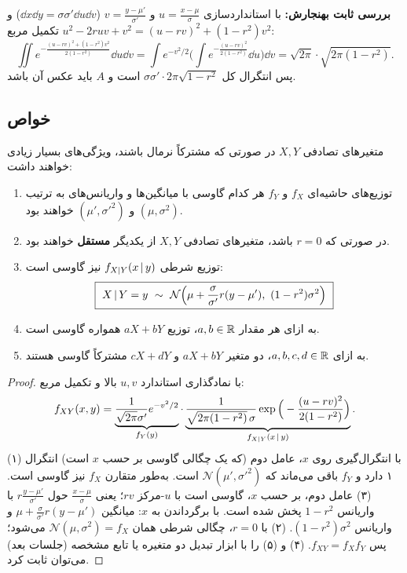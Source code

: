 \begin{note}
\notetitle \textbf{بررسی ثابت بهنجارش:} با استانداردسازی $u=\frac{x-\mu}{\sigma}$ و $v=\frac{y-\mu'}{\sigma'}$ ($\dd x\dd y=\sigma\sigma'\dd u\dd v$) و تکمیل مربع $u^2-2ruv+v^2=(u-rv)^2+(1-r^2)v^2$:
\[
\iint e^{-\frac{(u-rv)^2+(1-r^2)v^2}{2(1-r^2)}}\dd u\dd v=\int e^{-v^2/2}\Big(\int e^{-\frac{(u-rv)^2}{2(1-r^2)}}\dd u\Big)\dd v=\sqrt{2\pi}\cdot\sqrt{2\pi(1-r^2)} .
\]
پس انتگرال کل $\sigma\sigma'\cdot2\pi\sqrt{1-r^2}$ است و $A$ باید عکس آن باشد. \checkmark
\end{note}

\subsection{خواص}
متغیرهای تصادفی $X,Y$ در صورتی که مشترکاً نرمال باشند، ویژگی‌های بسیار زیادی خواهند داشت:

\begin{theorem}
\begin{enumerate}
\item توزیع‌های حاشیه‌ای $f_X$ و $f_Y$ هر کدام گاوسی با میانگین‌ها و واریانس‌های به ترتیب $(\mu,\sigma^2)$ و $(\mu',\sigma'^2)$ خواهند بود.
\item در صورتی که $r=0$ باشد، متغیرهای تصادفی $X,Y$ از یکدیگر \textbf{مستقل} خواهند بود.
\item توزیع شرطی $f_{X|Y}(x\,|\, y)$ نیز گاوسی است:
\[
\boxed{\ X\given Y=y\ \sim\ \mathcal N\Big(\mu+\frac{\sigma}{\sigma'}r(y-\mu'),\ (1-r^2)\sigma^2\Big)\ }
\]
\item به ازای هر مقدار $a,b\in\mathbb{R}$، توزیع $aX+bY$ همواره گاوسی است.
\item به ازای $a,b,c,d\in\mathbb{R}$، دو متغیر $aX+bY$ و $cX+dY$ مشترکاً گاوسی هستند.
\end{enumerate}
\end{theorem}

\begin{proof}
با نمادگذاری استاندارد $u,v$ بالا و تکمیل مربع:
\[
f_{XY}(x,y)=\underbrace{\frac{1}{\sqrt{2\pi}\sigma'}e^{-v^2/2}}_{f_Y(y)}\cdot\underbrace{\frac{1}{\sqrt{2\pi(1-r^2)}\,\sigma}\exp\Big(-\frac{(u-rv)^2}{2(1-r^2)}\Big)}_{f_{X|Y}(x\,|\, y)} .
\]
(۱) با انتگرال‌گیری روی $x$، عامل دوم (که یک چگالی گاوسی بر حسب $x$ است) انتگرال ۱ دارد و $f_Y$ باقی می‌ماند که $\mathcal N(\mu',\sigma'^2)$ است. به‌طور متقارن $f_X$ نیز گاوسی است.
(۳) عامل دوم، بر حسب $x$، گاوسی است با $u$-مرکز $rv$؛ یعنی $\frac{x-\mu}{\sigma}$ حول $r\frac{y-\mu'}{\sigma'}$ با واریانس $1-r^2$ پخش شده است. با برگرداندن به $x$: میانگین $\mu+\frac{\sigma}{\sigma'}r(y-\mu')$ و واریانس $(1-r^2)\sigma^2$.
(۲) با $r=0$، چگالی شرطی همان $\mathcal N(\mu,\sigma^2)=f_X$ می‌شود؛ پس $f_{XY}=f_Xf_Y$.
(۴) و (۵) را با ابزار تبدیل دو متغیره یا تابع مشخصه (جلسات بعد) می‌توان ثابت کرد.
\end{proof}

